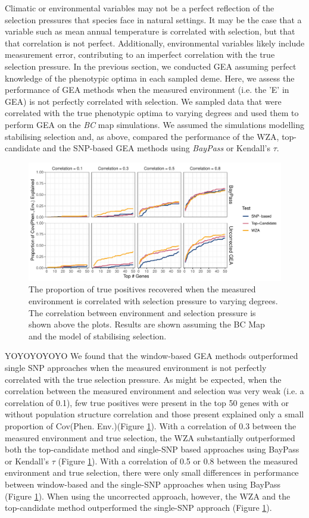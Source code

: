 \documentclass[10pt,twoside,lineno, twocolumn]{GSA_format}
\begin{document}
Climatic or environmental variables may not be a perfect reflection of the selection pressures that species face in natural settings. It may be the case that a variable such as mean annual temperature is correlated with selection, but that that correlation is not perfect. Additionally, environmental variables likely include measurement error, contributing to an imperfect correlation with the true selection pressure. In the previous section, we conducted GEA assuming perfect knowledge of the phenotypic optima in each sampled deme. Here, we assess the performance of GEA methods when the measured environment (i.e. the 'E' in GEA) is not perfectly correlated with selection. We sampled data that were correlated with the true phenotypic optima to varying degrees and used them to perform GEA on the \textit{BC} map simulations. We assumed the simulations modelling stabilising selection and, as above, compared the performance of the WZA, top-candidate and the SNP-based GEA methods using \textit{BayPass} or Kendall's $\tau$. \\



\begin{figure}
  \includegraphics[width=0.6\linewidth]{Plots/correlatedEnvironments_BCmapResults.pdf} 
  \caption{The proportion of true positives recovered when the measured environment is correlated with selection pressure to varying degrees. The correlation between environment and selection pressure is shown above the plots. Results are shown assuming the BC Map and the model of stabilising selection.}

  \label{fig:truePosCorrelated}
\end{figure}
YOYOYOYOYO
We found that the window-based GEA methods outperformed single SNP approaches when the measured environment is not perfectly correlated with the true selection pressure. As might be expected, when the correlation between the measured environment and selection was very weak (i.e. a correlation of 0.1), few true positives were present in the top 50 genes with or without population structure correlation and those present explained only a small proportion of Cov(Phen. Env.)(Figure \ref{fig:truePosCorrelated}). With a correlation of 0.3 between the measured environment and true selection, the WZA substantially outperformed both the top-candidate method and single-SNP based approaches using BayPass or Kendall's $\tau$ (Figure \ref{fig:truePosCorrelated}). With a correlation of 0.5 or 0.8 between the measured environment and true selection, there were only small differences in performance between window-based and the single-SNP approaches when using BayPass (Figure \ref{fig:truePosCorrelated}). When using the uncorrected approach, however, the WZA and the top-candidate method outperformed the single-SNP approach (Figure \ref{fig:truePosCorrelated}). \\
\end{document}
